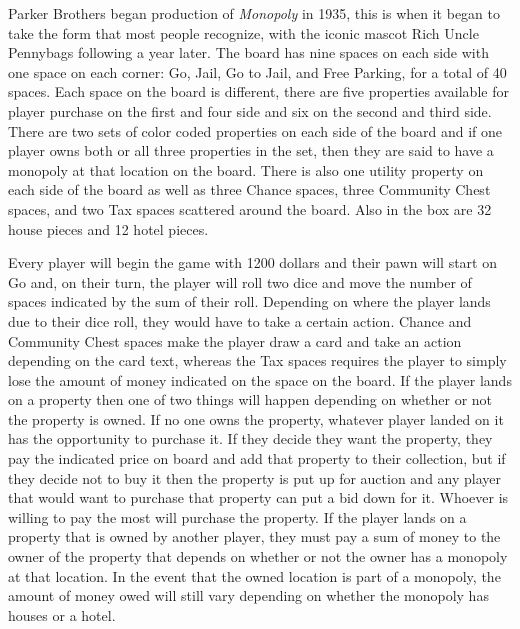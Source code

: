 \documentclass{article}
\begin{document}
Parker Brothers began production of \textit{Monopoly} in 1935, this is when it began to take the form that most people recognize, with the iconic mascot Rich Uncle Pennybags following a year later.  The board has nine spaces on each side with one space on each corner: Go, Jail, Go to Jail, and Free Parking, for a total of 40 spaces.  Each space on the board is different, there are five properties available for player purchase on the first and four side and six on the second and third side.  There are two sets of color coded properties on each side of the board and if one player owns both or all three properties in the set, then they are said to have a monopoly at that location on the board.  There is also one utility property on each side of the board as well as three Chance spaces, three Community Chest spaces, and two Tax spaces scattered around the board.  Also in the box are 32 house pieces and 12 hotel pieces.

Every player will begin the game with 1200 dollars and their pawn will start on Go and, on their turn, the player will roll two dice and move the number of spaces indicated by the sum of their roll.  Depending on where the player lands due to their dice roll, they would have to take a certain action.  Chance and Community Chest spaces make the player draw a card and take an action depending on the card text, whereas the Tax spaces requires the player to simply lose the amount of money indicated on the space on the board.  If the player lands on a property then one of two things will happen depending on whether or not the property is owned.  If no one owns the property, whatever player landed on it has the opportunity to purchase it.  If they decide they want the property, they pay the indicated price on board and add that property to their collection, but if they decide not to buy it then the property is put up for auction and any player that would want to purchase that property can put a bid down for it.  Whoever is willing to pay the most will purchase the property.  If the player lands on a property that is owned by another player, they must pay a sum of money to the owner of the property that depends on whether or not the owner has a monopoly at that location.  In the event that the owned location is part of a monopoly, the amount of money owed will still vary depending on whether the monopoly has houses or a hotel.
\end{document}
